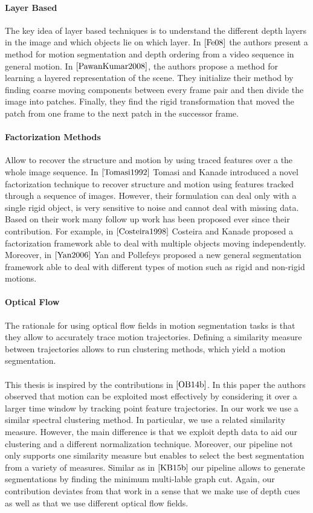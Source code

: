 \paragraph{Layer Based} The key idea of layer based techniques is to understand the different depth layers in the image and which objects lie on which layer. In $\cite{Fe08}$ the authors present a method for motion segmentation and depth ordering from a video sequence in general motion. In $\cite{PawanKumar2008}$, the authors propose a method for learning a layered representation of the scene. They initialize their method by finding coarse moving components between every frame pair and then divide the image into patches. Finally, they find the rigid transformation that moved the patch from one frame to the next patch in the successor frame.

\paragraph{Factorization Methods} Allow to recover the structure and motion by using traced features over a the whole image sequence. In $\cite{Tomasi1992}$ Tomasi and Kanade introduced a novel factorization technique to recover structure and motion using features tracked through a sequence of images. However, their formulation can deal only with a single rigid object, is very sensitive to noise and cannot deal with missing data. Based on their work many follow up work has been proposed ever since their contribution. For example, in $\cite{Costeira1998}$ Costeira and Kanade proposed a factorization framework able to deal with multiple objects moving independently. Moreover, in $\cite{Yan2006}$ Yan and Pollefeys proposed a new general segmentation framework able to deal with different types of motion such as rigid and non-rigid motions. 

\paragraph{Optical Flow}
The rationale for using optical flow fields in motion segmentation tasks is that they allow to accurately trace motion trajectories. Defining a similarity measure between trajectories allows to run clustering methods, which yield a motion segmentation. \\ \\
This thesis is inspired by the contributions in $\cite{OB14b}$. In this paper the authors observed that motion can be exploited most effectively by considering it over a larger time window by tracking point feature trajectories. In our work we use a similar spectral clustering method. In particular, we use a related similarity measure. However, the main difference is that we exploit depth data to aid our clustering and a different normalization technique. Moreover, our pipeline not only supports one similarity measure but enables to select the best segmentation from a variety of measures. Similar as in $\cite{KB15b}$ our pipeline allows to generate segmentations by finding the minimum multi-lable graph cut. Again, our contribution deviates from that work in a sense that we make use of depth cues as well as that we use different optical flow fields.

